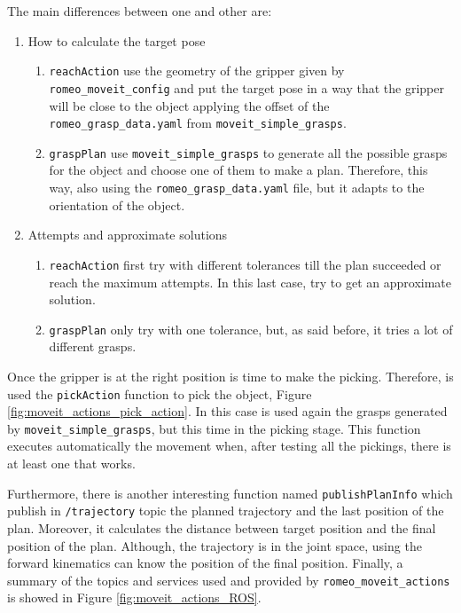\documentclass[12pt,a4paper,final,twoside,openright]{report}
\begin{document}
The main differences between one and other are: 
\begin{enumerate}
\item How to calculate the target pose 
\begin{enumerate}
\item \texttt{reachAction} use the geometry of the gripper given by \texttt{romeo\_moveit\_config} and put the target pose in a way that the gripper will be close to the object applying the offset of the \texttt{romeo\_grasp\_data.yaml} from \texttt{moveit\_simple\_grasps}. 
\item \texttt{graspPlan} use \texttt{moveit\_simple\_grasps} to generate all the possible grasps for the object and choose one of them to make a plan. Therefore, this way, also using the \texttt{romeo\_grasp\_data.yaml} file, but it adapts to the orientation of the object. 
\end{enumerate}

\item Attempts and approximate solutions
\begin{enumerate}
\item \texttt{reachAction} first try with different tolerances till the plan succeeded or reach the maximum attempts. In this last case, try to get an approximate solution.
\item \texttt{graspPlan} only try with one tolerance, but, as said before, it tries a lot of different grasps.
\end{enumerate}
\end{enumerate}

Once the gripper is at the right position is time to make the picking. Therefore, is used the \texttt{pickAction} function to pick the object, Figure \ref{fig:moveit_actions_pick_action}. In this case is used again the grasps generated by \texttt{moveit\_simple\_grasps}, but this time in the picking stage. This function executes automatically the movement when, after testing all the pickings, there is at least one that works.

Furthermore, there is another interesting function named \texttt{publishPlanInfo} which publish in \texttt{/trajectory} topic the planned trajectory and the last position of the plan. Moreover, it calculates the distance between target position and the final position of the plan. Although, the trajectory is in the joint space, using the forward kinematics can know the position of the final position. Finally, a summary of the topics and services used and provided by \texttt{romeo\_moveit\_actions} is showed in Figure \ref{fig:moveit_actions_ROS}. 
\end{document}
